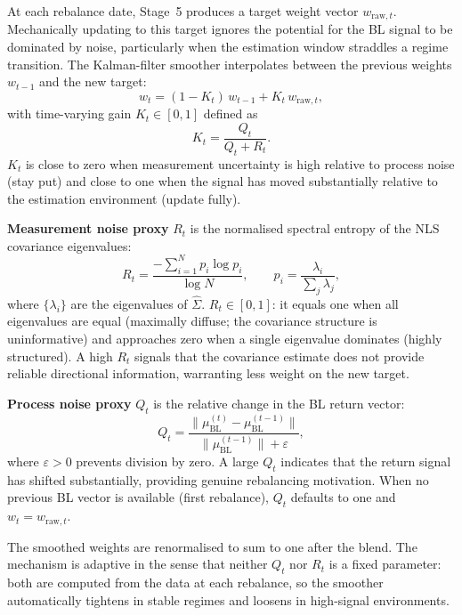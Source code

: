 \documentclass[a4paper,12pt]{report}
\newcommand{\muBL}{\mu_{\mathrm{BL}}}
\begin{document}
At each rebalance date, Stage~5 produces a target weight vector
$w_{\mathrm{raw},t}$. Mechanically updating to this target ignores the
potential for the BL signal to be dominated by noise, particularly when the
estimation window straddles a regime transition. The Kalman-filter smoother
interpolates between the previous weights $w_{t-1}$ and the new target:
\begin{equation}
  w_t = (1 - K_t)\,w_{t-1} + K_t\,w_{\mathrm{raw},t},
  \label{eq:kf-update}
\end{equation}
with time-varying gain $K_t \in [0,1]$ defined as
\begin{equation}
  K_t = \frac{Q_t}{Q_t + R_t}.
  \label{eq:kf-gain}
\end{equation}
$K_t$ is close to zero when measurement uncertainty is high relative to
process noise (stay put) and close to one when the signal has moved
substantially relative to the estimation environment (update fully).

\textbf{Measurement noise proxy} $R_t$ is the normalised spectral entropy
of the NLS covariance eigenvalues:
\begin{equation}
  R_t = \frac{-\sum_{i=1}^{N} p_i \log p_i}{\log N}, \qquad
  p_i = \frac{\lambda_i}{\sum_j \lambda_j},
  \label{eq:kf-R}
\end{equation}
where $\{\lambda_i\}$ are the eigenvalues of $\hat{\Sigma}$. $R_t \in [0,1]$:
it equals one when all eigenvalues are equal (maximally diffuse; the covariance
structure is uninformative) and approaches zero when a single eigenvalue
dominates (highly structured). A high $R_t$ signals that the covariance
estimate does not provide reliable directional information, warranting
less weight on the new target.

\textbf{Process noise proxy} $Q_t$ is the relative change in the BL return
vector:
\begin{equation}
  Q_t = \frac{\|\muBL^{(t)} - \muBL^{(t-1)}\|}
             {\|\muBL^{(t-1)}\| + \varepsilon},
  \label{eq:kf-Q}
\end{equation}
where $\varepsilon > 0$ prevents division by zero. A large $Q_t$ indicates
that the return signal has shifted substantially, providing genuine
rebalancing motivation. When no previous BL vector is available (first
rebalance), $Q_t$ defaults to one and $w_t = w_{\mathrm{raw},t}$.

The smoothed weights are renormalised to sum to one after the blend. The
mechanism is adaptive in the sense that neither $Q_t$ nor $R_t$ is a fixed
parameter: both are computed from the data at each rebalance, so the smoother
automatically tightens in stable regimes and loosens in high-signal
environments.
\end{document}
